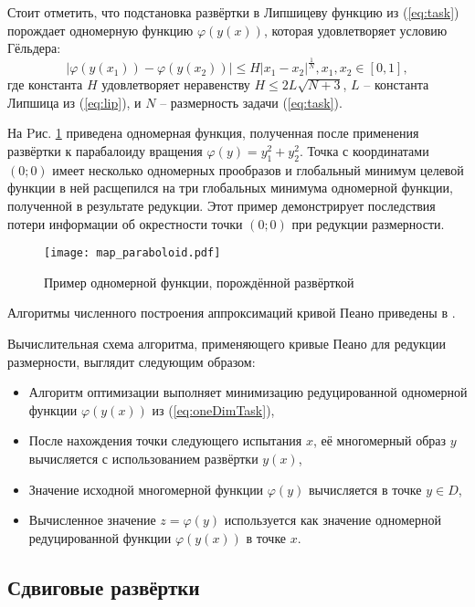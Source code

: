 Стоит отметить, что подстановка развёртки в Липшицеву функцию  %
из (\ref{eq:task}) порождает одномерную функцию \(\varphi(y(x))\), которая удовлетворяет условию Гёльдера:
\begin{equation}
\label{eq:holder}
|\varphi(y(x_1))-\varphi(y(x_2))|\leq H{|x_1-x_2|}^{\frac{1}{N}}, x_1,x_2\in[0,1],
\end{equation}
где константа $H$ удовлетворяет неравенству \(H\leqslant2L\sqrt{N+3}\), \(L\) -- константа Липшица из (\ref{eq:lip}),
и \(N\) -- размерность задачи (\ref{eq:task}).

На Pис. \ref{fig:evolvent_example} приведена одномерная функция, полученная после применения развёртки к
парабалоиду вращения \(\varphi(y)=y_1^2+y_2^2\). Точка с координатами \((0;0)\) имеет несколько одномерных прообразов
и глобальный минимум целевой функции в ней расщепился на три глобальных минимума одномерной функции, полученной в результате
редукции. Этот пример демонстрирует последствия потери информации об окрестности точки \((0;0)\) при редукции размерности.

\begin{figure}[ht]
    \center
    \texttt{[image: map\_paraboloid.pdf]}
    \caption{Пример одномерной функции, порождённой развёрткой}
    \label{fig:evolvent_example}
\end{figure}

Алгоритмы численного построения аппроксимаций кривой Пеано приведены в \cite{Strongin2000}.

Вычислительная схема алгоритма, применяющего кривые Пеано для редукции размерности, выглядит следующим образом:
\begin{itemize}
  \item Алгоритм оптимизации выполняет минимизацию редуцированной одномерной функции
  \(\varphi(y(x))\) из (\ref{eq:oneDimTask}),
  \item После нахождения точки следующего испытания \(x\), её многомерный образ \(y\)
  вычисляется с использованием развёртки \(y(x)\),
  \item Значение исходной многомерной функции \(\varphi(y)\) вычисляется в точке \(y\in D\),
  \item Вычисленное значение \(z=\varphi(y)\) используется как значение одномерной редуцированной функции \(\varphi(y(x))\) в точке \(x\).
\end{itemize}

\subsection{Сдвиговые развёртки}
\label{sec:shifted}

